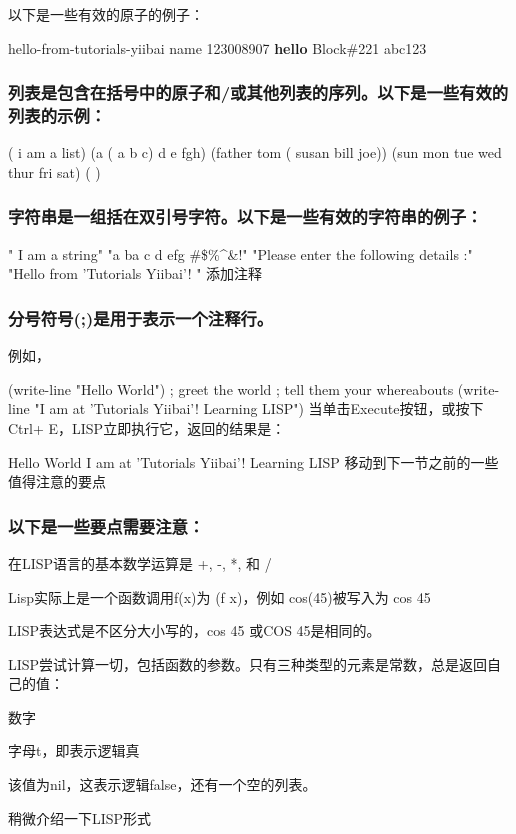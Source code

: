 \documentclass[11pt]{ctexart}
\begin{document}
{{{{以下是一些有效的原子的例子：

hello-from-tutorials-yiibai
name
123008907
\textbf{hello}
Block\#221
abc123
\subsubsection{列表是包含在括号中的原子和/或其他列表的序列。以下是一些有效的列表的示例：}
\label{sec:org9db8570}

( i am a list)
(a ( a b c) d e fgh)
(father tom ( susan bill joe))
(sun mon tue wed thur fri sat)
( )
\subsubsection{字符串是一组括在双引号字符。以下是一些有效的字符串的例子：}
\label{sec:org08523b2}

" I am a string"
"a ba c d efg \#\$\%\^{}\&!"
"Please enter the following details :"
"Hello from 'Tutorials Yiibai'! "
添加注释

\subsubsection{分号符号(;)是用于表示一个注释行。}
\label{sec:org504fae5}

例如，

(write-line "Hello World") ; greet the world
; tell them your whereabouts
(write-line "I am at 'Tutorials Yiibai'! Learning LISP")
当单击Execute按钮，或按下Ctrl+ E，LISP立即执行它，返回的结果是：

Hello World
I am at 'Tutorials Yiibai'! Learning LISP
移动到下一节之前的一些值得注意的要点

\subsubsection{以下是一些要点需要注意：}
\label{sec:orgf38a114}

在LISP语言的基本数学运算是 +, -, *, 和 /

Lisp实际上是一个函数调用f(x)为 (f x)，例如 cos(45)被写入为 cos 45

LISP表达式是不区分大小写的，cos 45 或COS 45是相同的。

LISP尝试计算一切，包括函数的参数。只有三种类型的元素是常数，总是返回自己的值：

数字

字母t，即表示逻辑真

该值为nil，这表示逻辑false，还有一个空的列表。

稍微介绍一下LISP形式

}}}}
\end{document}
